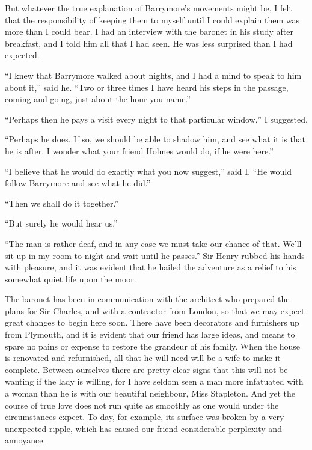 \documentclass[paper=5.5in:8.5in,BCOR=7mm,twoside,DIV=calc,12pt,usegeometry,openany,chapterprefix,endperiod,headings=big]{scrbook} %
\begin{document}
But whatever the true explanation of Barrymore's movements might be, I felt that the responsibility of keeping them to myself until I could explain them was more than I could bear. I had an interview with the baronet in his study after breakfast, and I told him all that I had seen. He was less surprised than I had expected.

\enquote{I knew that Barrymore walked about nights, and I had a mind to speak to him about it,} said he. \enquote{Two or three times I have heard his steps in the passage, coming and going, just about the hour you name.}

\enquote{Perhaps then he pays a visit every night to that particular window,} I suggested.

\enquote{Perhaps he does. If so, we should be able to shadow him, and see what it is that he is after. I wonder what your friend Holmes would do, if he were here.}

\enquote{I believe that he would do exactly what you now suggest,} said I. \enquote{He would follow Barrymore and see what he did.}

\enquote{Then we shall do it together.}

\enquote{But surely he would hear us.}

\enquote{The man is rather deaf, and in any case we must take our chance of that. We'll sit up in my room to-night and wait until he passes.} Sir Henry rubbed his hands with pleasure, and it was evident that he hailed the adventure as a relief to his somewhat quiet life upon the moor.

The baronet has been in communication with the architect who prepared the plans for Sir Charles, and with a contractor from London, so that we may expect great changes to begin here soon. There have been decorators and furnishers up from Plymouth, and it is evident that our friend has large ideas, and means to spare no pains or expense to restore the grandeur of his family. When the house is renovated and refurnished, all that he will need will be a wife to make it complete. Between ourselves there are pretty clear signs that this will not be wanting if the lady is willing, for I have seldom seen a man more infatuated with a woman than he is with our beautiful neighbour, Miss Stapleton. And yet the course of true love does not run quite as smoothly as one would under the circumstances expect. To-day, for example, its surface was broken by a very unexpected ripple, which has caused our friend considerable perplexity and annoyance.
\end{document}

